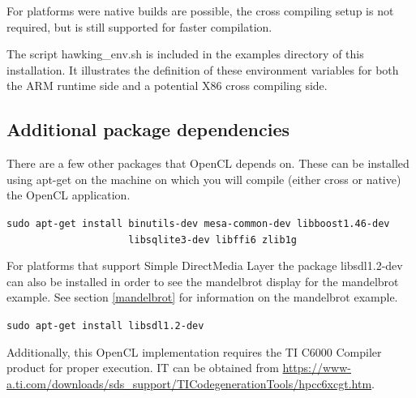 \documentclass[10pt]{article}
\begin{document}
   For platforms were native builds are possible, the cross compiling setup
   is not required, but is still supported for faster compilation.

   The script hawking\_env.sh is included in the examples directory of this
   installation. It illustrates the definition of these environment variables for 
   both the ARM runtime side and a potential X86 cross compiling side.

\subsection{Additional package dependencies}

   There are a few other packages that OpenCL depends on.  These can be
   installed using apt-get on the machine on which you will compile (either
   cross or native) the OpenCL application.  

   \verb!sudo apt-get install binutils-dev mesa-common-dev libboost1.46-dev!\\
   \verb!                     libsqlite3-dev libffi6 zlib1g!

   For platforms that support Simple DirectMedia Layer the package 
   libsdl1.2-dev can also be installed in order to see the mandelbrot display for
   the mandelbrot example. See section \ref{mandelbrot} for information on the
   mandelbrot example.
   
   \verb!sudo apt-get install libsdl1.2-dev!

   Additionally, this OpenCL implementation requires the TI C6000 Compiler
   product for proper execution.  IT can be obtained from
   \url{https://www-a.ti.com/downloads/sds_support/TICodegenerationTools/hpcc6xcgt.htm}.
\end{document}

